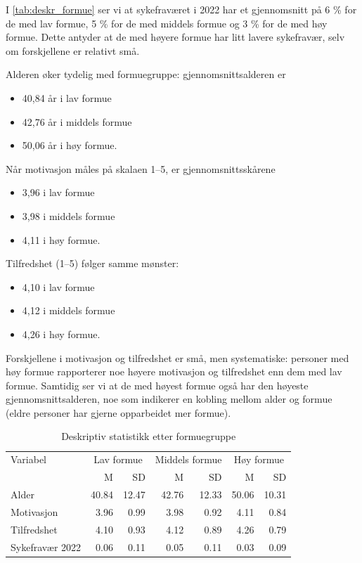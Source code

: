\documentclass[
  12pt,
  a4paper,
  DIV=11,
  numbers=noendperiod]{scrartcl}
\providecommand{\tightlist}{%
  \setlength{\itemsep}{0pt}\setlength{\parskip}{0pt}}\usepackage{longtable,booktabs,array}
\begin{document}
I \autoref{tab:deskr_formue} ser vi at sykefraværet i 2022 har et
gjennomsnitt på 6 \% for de med lav formue, 5 \% for de med middels
formue og 3 \% for de med høy formue. Dette antyder at de med høyere
formue har litt lavere sykefravær, selv om forskjellene er relativt små.

Alderen øker tydelig med formuegruppe: gjennomsnittsalderen er

\begin{itemize}
\tightlist
\item
  40,84 år i lav formue
\item
  42,76 år i middels formue
\item
  50,06 år i høy formue.
\end{itemize}

Når motivasjon måles på skalaen 1--5, er gjennomsnittsskårene

\begin{itemize}
\tightlist
\item
  3,96 i lav formue
\item
  3,98 i middels formue
\item
  4,11 i høy formue.
\end{itemize}

Tilfredshet (1--5) følger samme mønster:

\begin{itemize}
\tightlist
\item
  4,10 i lav formue
\item
  4,12 i middels formue
\item
  4,26 i høy formue.
\end{itemize}

Forskjellene i motivasjon og tilfredshet er små, men systematiske:
personer med høy formue rapporterer noe høyere motivasjon og tilfredshet
enn dem med lav formue. Samtidig ser vi at de med høyest formue også har
den høyeste gjennomsnittsalderen, noe som indikerer en kobling mellom
alder og formue (eldre personer har gjerne opparbeidet mer formue).

\begin{table}[ht]
\centering
\begin{tabular}{lrrrrrr}
\toprule
Variabel             & \multicolumn{2}{c}{Lav formue} & \multicolumn{2}{c}{Middels formue} & \multicolumn{2}{c}{Høy formue} \\
                     & M       & SD       & M         & SD        & M       & SD      \\
\midrule
Alder                & 40.84   & 12.47    & 42.76     & 12.33     & 50.06   & 10.31   \\
Motivasjon           & 3.96    & 0.99     & 3.98      & 0.92      & 4.11    & 0.84    \\
Tilfredshet          & 4.10    & 0.93     & 4.12      & 0.89      & 4.26    & 0.79    \\
Sykefravær 2022      & 0.06    & 0.11     & 0.05      & 0.11      & 0.03    & 0.09    \\
\bottomrule
\end{tabular}
\caption{Deskriptiv statistikk etter formuegruppe}
\label{tab:deskr_formue}
\end{table}
\end{document}
